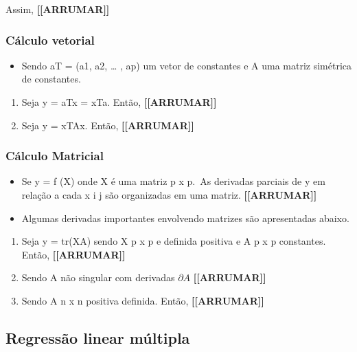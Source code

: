 \documentclass[
]{article}
\providecommand{\tightlist}{%
  \setlength{\itemsep}{0pt}\setlength{\parskip}{0pt}}
\begin{document}
Assim, \textbf{{[}{[}ARRUMAR{]}{]}}

\hypertarget{cuxe1lculo-vetorial-1}{%
\subsubsection{Cálculo vetorial}\label{cuxe1lculo-vetorial-1}}

\begin{itemize}
\tightlist
\item
  Sendo aT = (a1, a2, \ldots{} , ap) um vetor de constantes e A uma
  matriz simétrica de constantes.
\end{itemize}

\begin{enumerate}
\def\labelenumi{\arabic{enumi}.}
\item
  Seja y = aTx = xTa. Então, \textbf{{[}{[}ARRUMAR{]}{]}}
\item
  Seja y = xTAx. Então, \textbf{{[}{[}ARRUMAR{]}{]}}
\end{enumerate}

\hypertarget{cuxe1lculo-matricial}{%
\subsubsection{Cálculo Matricial}\label{cuxe1lculo-matricial}}

\begin{itemize}
\item
  Se y = f (X) onde X é uma matriz p x p.~As derivadas parciais de y em
  relação a cada x i j são organizadas em uma matriz.
  \textbf{{[}{[}ARRUMAR{]}{]}}
\item
  Algumas derivadas importantes envolvendo matrizes são apresentadas
  abaixo.
\end{itemize}

\begin{enumerate}
\def\labelenumi{\arabic{enumi}.}
\item
  Seja y = tr(XA) sendo X p x p e definida positiva e A p x p
  constantes. Então, \textbf{{[}{[}ARRUMAR{]}{]}}
\item
  Sendo A não singular com derivadas \(\partial A\)
  \textbf{{[}{[}ARRUMAR{]}{]}}
\item
  Sendo A n x n positiva definida. Então, \textbf{{[}{[}ARRUMAR{]}{]}}
\end{enumerate}

\hypertarget{regressuxe3o-linear-muxfaltipla}{%
\subsection{Regressão linear
múltipla}\label{regressuxe3o-linear-muxfaltipla}}
\end{document}
